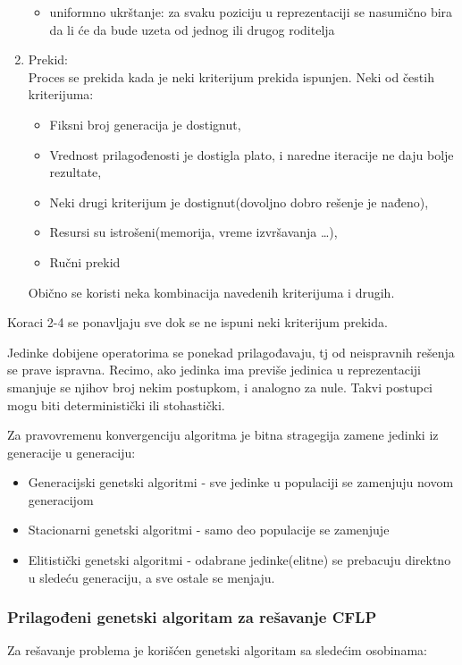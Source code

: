 \documentclass[a4paper]{article}
\begin{document}
\begin{enumerate}
\begin{itemize}
\item uniformno ukrštanje: za svaku poziciju u reprezentaciji se nasumično bira da li će da bude uzeta od jednog ili drugog roditelja
\end{itemize}
\item Prekid: \\ Proces se prekida kada je neki kriterijum prekida ispunjen. Neki od čestih kriterijuma:
\begin{itemize}
\item Fiksni broj generacija je dostignut,
\item Vrednost prilagođenosti je dostigla plato, i naredne iteracije ne daju bolje rezultate,
\item Neki drugi kriterijum je dostignut(dovoljno dobro rešenje je nađeno),
\item Resursi su istrošeni(memorija, vreme izvršavanja \ldots),
\item Ručni prekid
\end{itemize}
Obično se koristi neka kombinacija navedenih kriterijuma i drugih.
\end{enumerate}

 Koraci 2-4 se ponavljaju sve dok se ne ispuni neki kriterijum prekida.

Jedinke dobijene operatorima se ponekad prilagođavaju, tj od neispravnih rešenja se prave ispravna. Recimo, ako jedinka ima previše  jedinica u reprezentaciji smanjuje se njihov broj nekim postupkom, i analogno za nule. Takvi postupci mogu biti deterministički ili stohastički. 

Za pravovremenu konvergenciju algoritma je bitna stragegija zamene jedinki iz generacije u generaciju:
\begin{itemize}
\item Generacijski genetski algoritmi - sve jedinke u populaciji se zamenjuju novom generacijom
\item Stacionarni genetski algoritmi - samo deo populacije se zamenjuje
\item Elitistički genetski algoritmi - odabrane jedinke(elitne) se prebacuju direktno u sledeću generaciju, a sve ostale se menjaju.
\end{itemize}

\subsubsection{Prilagođeni genetski algoritam za rešavanje CFLP}

Za rešavanje problema je korišćen genetski algoritam sa sledećim osobinama:
\end{document}
